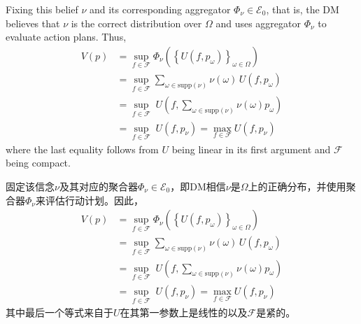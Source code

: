 \documentclass[12pt,a4paper]{article}
\newenvironment{original}
  {\par\vspace{4pt}\noindent\color{black}\ignorespaces}
  {\par\vspace{2pt}}
\newenvironment{translation}
  {\par\vspace{2pt}\noindent\color{myblue}\ignorespaces}
  {\par\vspace{6pt}}
\newcommand{\calF}{\mathcal{F}}
\newcommand{\calE}{\mathcal{E}}
\newcommand{\supp}{\mathrm{supp}}
\begin{document}
\begin{original}
Fixing this belief $\nu$ and its corresponding aggregator $\Phi_{\nu}\in\calE_0$, that is, the DM believes that $\nu$ is the correct distribution over $\Omega$ and uses aggregator $\Phi_{\nu}$ to evaluate action plans. Thus,
\begin{align}
    V(p) &= \sup_{f\in\calF} \Phi_{\nu}\left( \left\{ U(f, p_{\omega}) \right\}_{\omega\in\Omega} \right) \nonumber\\
         &= \sup_{f\in\calF} \sum_{\omega\in\supp(\nu)} \nu(\omega) \, U(f, p_{\omega}) \nonumber\\
         &= \sup_{f\in\calF} \; U\!\left(f, \sum_{\omega\in\supp(\nu)}\nu(\omega)p_{\omega}\right) \nonumber\\
         &= \sup_{f\in\calF} \; U(f, p_{\nu}) = \max_{f\in\calF} U(f, p_{\nu})
\end{align}
where the last equality follows from $U$ being linear in its first argument and $\calF$ being compact.
\end{original}

\begin{translation}
固定该信念$\nu$及其对应的聚合器$\Phi_{\nu}\in\calE_0$，即DM相信$\nu$是$\Omega$上的正确分布，并使用聚合器$\Phi_{\nu}$来评估行动计划。因此，
\begin{align}
    V(p) &= \sup_{f\in\calF} \Phi_{\nu}\left( \left\{ U(f, p_{\omega}) \right\}_{\omega\in\Omega} \right) \nonumber\\
         &= \sup_{f\in\calF} \sum_{\omega\in\supp(\nu)} \nu(\omega) \, U(f, p_{\omega}) \nonumber\\
         &= \sup_{f\in\calF} \; U\!\left(f, \sum_{\omega\in\supp(\nu)}\nu(\omega)p_{\omega}\right) \nonumber\\
         &= \sup_{f\in\calF} \; U(f, p_{\nu}) = \max_{f\in\calF} U(f, p_{\nu})
\end{align}
其中最后一个等式来自于$U$在其第一参数上是线性的以及$\calF$是紧的。
\end{translation}
\end{document}
